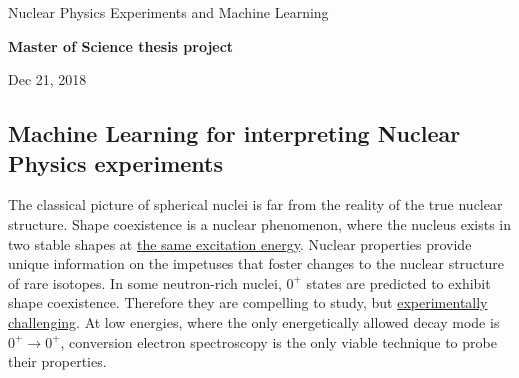 \documentclass[%
oneside,                 %
final,                   %
10pt]{article}
\begin{document}

\newcommand{\exercisesection}[1]{\subsection*{#1}}






\thispagestyle{empty}

\begin{center}
{\LARGE\bf
\begin{spacing}{1.25}
Nuclear Physics Experiments and  Machine Learning
\end{spacing}
}
\end{center}


\begin{center}
{\bf Master of Science thesis project${}^{}$} \\ [0mm]
\end{center}

\begin{center}
\end{center}
    

\begin{center}
Dec 21, 2018
\end{center}

\vspace{1cm}


\subsection*{Machine Learning for interpreting Nuclear Physics experiments}



The classical picture of spherical nuclei is far from the reality of the
true nuclear structure. Shape coexistence is a nuclear phenomenon, where
the nucleus exists in two stable shapes at \href{{https://www.europhysicsnews.org/articles/epn/pdf/2001/01/epn01101.pdf}}{the same excitation energy}.
Nuclear properties provide unique information on the impetuses that
foster changes to the nuclear structure of rare isotopes. In some
neutron-rich nuclei, $0^{+}$ states are predicted to exhibit shape
coexistence. Therefore they are compelling to study, but \href{{http://iopscience.iop.org/article/10.1088/0954-3899/43/2/024001}}{experimentally
challenging}.
At low energies, where the only energetically allowed decay mode is
$0^{+} \rightarrow 0^{+}$, conversion electron spectroscopy is the
only viable technique to probe their properties.
\end{document}
